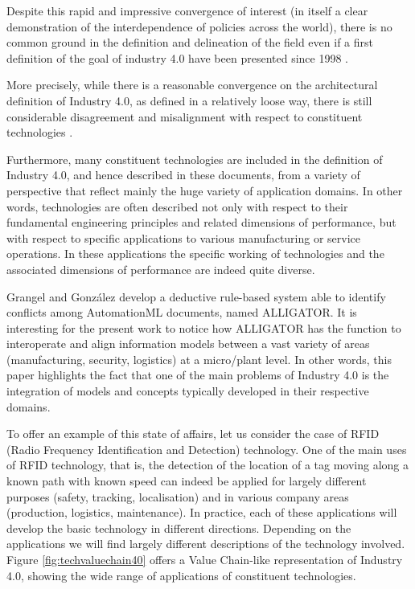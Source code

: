 \documentclass[]{book}
\theoremstyle{definition}
\theoremstyle{definition}
\theoremstyle{definition}
\theoremstyle{remark}
\begin{document}
Despite this rapid and impressive convergence of interest (in itself a
clear demonstration of the interdependence of policies across the
world), there is no common ground in the definition and delineation of
the field even if a first definition of the goal of industry 4.0 have
been presented since 1998 \citep{national1998visionary}.

More precisely, while there is a reasonable convergence on the
architectural definition of Industry 4.0, as defined in a relatively
loose way, there is still considerable disagreement and misalignment
with respect to constituent technologies
\citep{riel2017integrated, smit2016industry, o2015industrial}.

Furthermore, many constituent technologies are included in the
definition of Industry 4.0, and hence described in these documents, from
a variety of perspective that reflect mainly the huge variety of
application domains. In other words, technologies are often described
not only with respect to their fundamental engineering principles and
related dimensions of performance, but with respect to specific
applications to various manufacturing or service operations. In these
applications the specific working of technologies and the associated
dimensions of performance are indeed quite diverse.

Grangel and González \citep{grangel2016towards} develop a deductive
rule-based system able to identify conflicts among AutomationML
documents, named ALLIGATOR. It is interesting for the present work to
notice how ALLIGATOR has the function to interoperate and align
information models between a vast variety of areas (manufacturing,
security, logistics) at a micro/plant level. In other words, this paper
highlights the fact that one of the main problems of Industry 4.0 is the
integration of models and concepts typically developed in their
respective domains.

To offer an example of this state of affairs, let us consider the case
of RFID (Radio Frequency Identification and Detection) technology. One
of the main uses of RFID technology, that is, the detection of the
location of a tag moving along a known path with known speed can indeed
be applied for largely different purposes (safety, tracking,
localisation) and in various company areas (production, logistics,
maintenance). In practice, each of these applications will develop the
basic technology in different directions. Depending on the applications
we will find largely different descriptions of the technology involved.
Figure \ref{fig:techvaluechain40} offers a Value Chain-like
representation of Industry 4.0, showing the wide range of applications
of constituent technologies.
\end{document}
